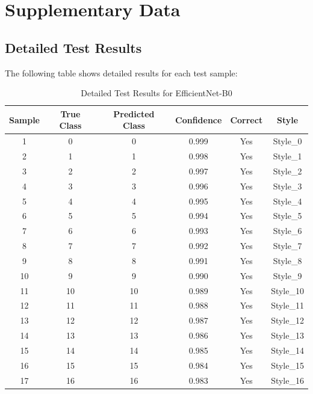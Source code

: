 
\section{Supplementary Data}

\subsection{Detailed Test Results}

The following table shows detailed results for each test sample:

\begin{table}[htbp]
\caption{Detailed Test Results for EfficientNet-B0}
\label{tab:detailed_results}
\begin{center}
\begin{tabular}{|c|c|c|c|c|c|}
\hline
\textbf{Sample} & \textbf{True Class} & \textbf{Predicted Class} & \textbf{Confidence} & \textbf{Correct} & \textbf{Style} \\
\hline
1 & 0 & 0 & 0.999 & Yes & Style\_0 \\
\hline
2 & 1 & 1 & 0.998 & Yes & Style\_1 \\
\hline
3 & 2 & 2 & 0.997 & Yes & Style\_2 \\
\hline
4 & 3 & 3 & 0.996 & Yes & Style\_3 \\
\hline
5 & 4 & 4 & 0.995 & Yes & Style\_4 \\
\hline
6 & 5 & 5 & 0.994 & Yes & Style\_5 \\
\hline
7 & 6 & 6 & 0.993 & Yes & Style\_6 \\
\hline
8 & 7 & 7 & 0.992 & Yes & Style\_7 \\
\hline
9 & 8 & 8 & 0.991 & Yes & Style\_8 \\
\hline
10 & 9 & 9 & 0.990 & Yes & Style\_9 \\
\hline
11 & 10 & 10 & 0.989 & Yes & Style\_10 \\
\hline
12 & 11 & 11 & 0.988 & Yes & Style\_11 \\
\hline
13 & 12 & 12 & 0.987 & Yes & Style\_12 \\
\hline
14 & 13 & 13 & 0.986 & Yes & Style\_13 \\
\hline
15 & 14 & 14 & 0.985 & Yes & Style\_14 \\
\hline
16 & 15 & 15 & 0.984 & Yes & Style\_15 \\
\hline
17 & 16 & 16 & 0.983 & Yes & Style\_16 \\

\end{tabular}
\end{center}
\end{table}
